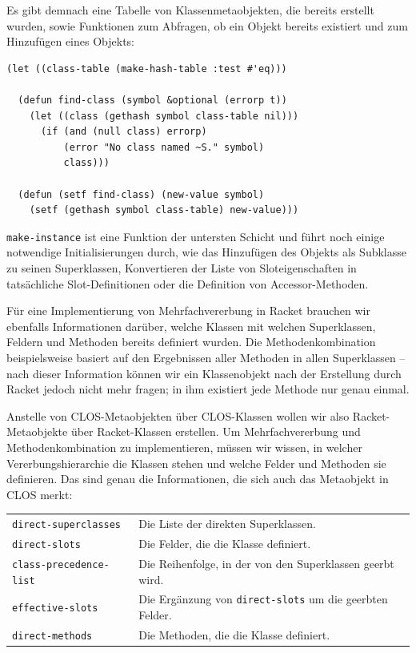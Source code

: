Es gibt demnach eine Tabelle von Klassenmetaobjekten, die bereits erstellt wurden, sowie Funktionen zum Abfragen, ob ein Objekt bereits existiert und zum Hinzufügen eines Objekts:

\begin{lstlisting}
(let ((class-table (make-hash-table :test #'eq)))
  
  (defun find-class (symbol &optional (errorp t))
    (let ((class (gethash symbol class-table nil)))
      (if (and (null class) errorp)
          (error "No class named ~S." symbol)
          class)))
  
  (defun (setf find-class) (new-value symbol)
    (setf (gethash symbol class-table) new-value)))
\end{lstlisting}

\texttt{make-instance} ist eine Funktion der untersten Schicht und führt noch einige notwendige Initialisierungen durch, wie das Hinzufügen des Objekts als Subklasse zu seinen Superklassen, Konvertieren der Liste von Sloteigenschaften in tatsächliche Slot-Definitionen oder die Definition von Accessor-Methoden. 

Für eine Implementierung von Mehrfachvererbung in Racket brauchen wir ebenfalls Informationen darüber, welche Klassen mit welchen Superklassen, Feldern und Methoden bereits definiert wurden. Die Methodenkombination beispielsweise basiert auf den Ergebnissen aller Methoden in allen Superklassen -- nach dieser Information können wir ein Klassenobjekt nach der Erstellung durch Racket jedoch nicht mehr fragen; in ihm existiert jede Methode nur genau einmal.

Anstelle von CLOS-Metaobjekten über CLOS-Klassen wollen wir also Racket-Metaobjekte über Racket-Klassen erstellen. Um Mehrfachvererbung und Methodenkombination zu implementieren, müssen wir wissen, in welcher Vererbungshierarchie die Klassen stehen und welche Felder und Methoden sie definieren. Das sind genau die Informationen, die sich auch das Metaobjekt in CLOS merkt:

\begin{tabular}{p{5cm}p{9cm}}
 \texttt{direct-superclasses} & Die Liste der direkten Superklassen. \\
 \texttt{direct-slots} & Die Felder, die die Klasse definiert. \\
 \texttt{class-precedence-list} & Die Reihenfolge, in der von den Superklassen geerbt wird.\\
 \texttt{effective-slots} & Die Ergänzung von \texttt{direct-slots} um die geerbten Felder. \\
 \texttt{direct-methods} & Die Methoden, die die Klasse definiert.
\end{tabular}


